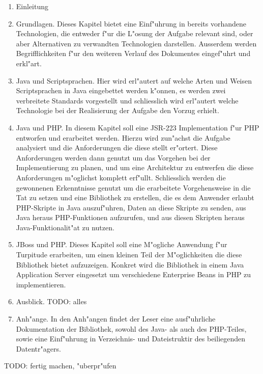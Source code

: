 \begin{enumerate}
    \item Einleitung
    \item Grundlagen. Dieses Kapitel bietet eine Einf"uhrung in bereits vorhandene Technologien, die entweder
    f"ur die L"osung der Aufgabe relevant sind, oder aber Alternativen zu verwandten Technologien darstellen.
    Ausserdem werden Begrifflichkeiten f"ur den weiteren Verlauf des Dokumentes eingef"uhrt und erkl"art.
    \item Java und Scriptsprachen. Hier wird erl"autert auf welche Arten und Weisen Scriptsprachen in Java
    eingebettet werden k"onnen, es werden zwei verbreitete Standards vorgestellt und schliesslich wird
    erl"autert welche Technologie bei der Realisierung der Aufgabe den Vorzug erhielt.
    \item Java und PHP. In diesem Kapitel soll eine JSR-223 Implementation f"ur PHP entworfen und erarbeitet werden. Hierzu wird zun"achst
    die Aufgabe analysiert und die Anforderungen die diese stellt er"ortert. Diese Anforderungen werden dann genutzt
    um das Vorgehen bei der Implementierung zu planen, und um eine Architektur zu entwerfen die diese Anforderungen
    m"oglichst komplett erf"ullt. Schliesslich werden die gewonnenen Erkenntnisse genutzt um die erarbeitete Vorgehensweise
    in die Tat zu setzen und eine Bibliothek zu erstellen, die es dem Anwender erlaubt PHP-Skripte in Java auszuf"uhren,
    Daten an diese Skripte zu senden, aus Java heraus PHP-Funktionen aufzurufen, und aus diesen Skripten heraus 
    Java-Funktionalit"at zu nutzen.
    \item JBoss und PHP. Dieses Kapitel soll eine M"ogliche Anwendung f"ur Turpitude erarbeiten, 
    um einen kleinen Teil der M"oglichkeiten die diese Bibliothek bietet aufzuzeigen. Konkret wird die Bibliothek
    in einem Java Application Server eingesetzt um verschiedene Enterprise Beans in PHP zu implementieren.
    \item Ausblick. TODO: alles
    \item Anh"ange. In den Anh"angen findet der Leser eine ausf"uhrliche Dokumentation der Bibliothek, sowohl des
    Java- als auch des PHP-Teiles, sowie eine Einf"uhrung in Verzeichnis- und Dateistruktir des beiliegenden
    Datentr"agers.
\end{enumerate}

TODO: fertig machen, "uberpr"ufen


